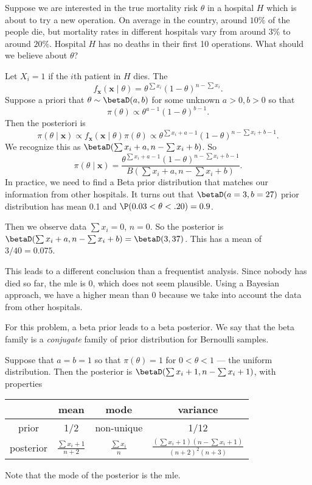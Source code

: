 \documentclass[a4paper]{article}
\begin{document}
\begin{eg}
  Suppose we are interested in the true mortality risk $\theta$ in a hospital $H$ which is about to try a new operation. On average in the country, around $10\%$ of the people die, but mortality rates in different hospitals vary from around $3\%$ to around $20\%$. Hospital $H$ has no deaths in their first 10 operations. What should we believe about $\theta$?

  Let $X_i = 1$ if the $i$th patient in $H$ dies. The
  \[
    f_{\mathbf{x}}(\mathbf{x}\mid \theta) = \theta^{\sum x_i}(1 - \theta)^{n - \sum x_i}.
  \]
  Suppose a priori that $\theta\sim \betaD(a, b)$ for some unknown $a > 0, b > 0$ so that
  \[
    \pi(\theta)\propto \theta^{a - 1}(1 - \theta)^{b - 1}.
  \]
  Then the posteriori is
  \[
    \pi(\theta\mid \mathbf{x})\propto f_{\mathbf{x}}(\mathbf{x}\mid \theta)\pi(\theta)\propto \theta^{\sum x_i + a - 1}(1 - \theta)^{n- \sum x_i + b - 1}.
  \]
  We recognize this as $\betaD(\sum x_i + a, n - \sum x_i + b)$. So
  \[
    \pi(\theta\mid \mathbf{x}) = \frac{\theta^{\sum x_i + a - 1}(1 - \theta)^{n - \sum x_i + b - 1}}{B(\sum x_i + a, n - \sum x_i + b)}.
  \]
  In practice, we need to find a Beta prior distribution that matches our information from other hospitals. It turns out that $\betaD(a = 3, b = 27)$ prior distribution has mean 0.1 and $\P(0.03 < \theta < .20) = 0.9$.

  Then we observe data $\sum x_i = 0$, $n = 0$. So the posterior is $\betaD(\sum x_i + a, n - \sum x_i + b) = \betaD(3, 37)$. This has a mean of $3/40 = 0.075$.

  This leads to a different conclusion than a frequentist analysis. Since nobody has died so far, the mle is $0$, which does not seem plausible. Using a Bayesian approach, we have a higher mean than $0$ because we take into account the data from other hospitals.
\end{eg}

For this problem, a beta prior leads to a beta posterior. We say that the beta family is a \emph{conjugate} family of prior distribution for Bernoulli samples.

Suppose that $a = b = 1$ so that $\pi (\theta) = 1$ for $0 < \theta < 1$ --- the uniform distribution. Then the posterior is $\betaD(\sum x_i + 1, n - \sum x_i + 1)$, with properties
\begin{center}
  \begin{tabular}{cccc}
    \toprule
    &mean & mode & variance\\
    \midrule
    prior & 1/2 & non-unique & 1/12\\
    posterior & $\displaystyle \frac{\sum x_i + 1}{n + 2}$ & $\displaystyle \frac{\sum x_i}{n}$ & $\displaystyle\frac{(\sum x_i + 1)(n - \sum x_i + 1)}{(n + 2)^2(n + 3)}$\\
    \bottomrule
  \end{tabular}
\end{center}
Note that the mode of the posterior is the mle.
\end{document}
